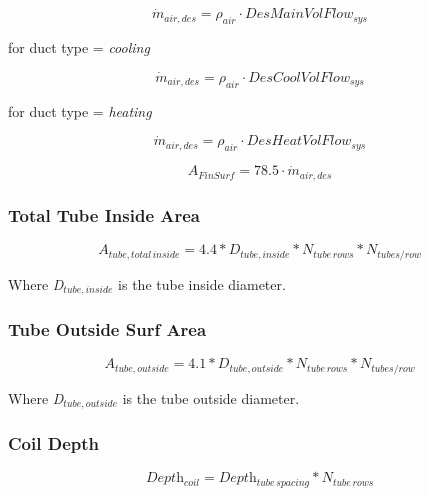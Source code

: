 \begin{equation}
\dot m_{air,des} = \rho_{air} \cdot DesMainVolFlow_{sys}
\end{equation}

for duct type = \emph{cooling}

\begin{equation}
\dot m_{air,des} = \rho_{air} \cdot DesCoolVolFlow_{sys}
\end{equation}

for duct type = \emph{heating}

\begin{equation}
\dot m_{air,des} = \rho_{air} \cdot DesHeatVolFlow_{sys}
\end{equation}

\begin{equation}
A_{FinSurf} = 78.5 \cdot \dot m_{air,des}
\end{equation}

\subsubsection{Total Tube Inside Area}\label{total-tube-inside-area}

\begin{equation}
\textit{A\(_{tube,total\, inside}\)} = 4.4 *\textit{D\(_{tube,inside}\)} *\textit{N\(_{tube\, rows}\)} *\textit{N\(_{tubes/row}\)}
\end{equation}

Where \emph{D\(_{tube,inside}\)} is the tube inside diameter.

\subsubsection{Tube Outside Surf Area}\label{tube-outside-surf-area}

\begin{equation}
\textit{A\(_{tube,outside}\)} = 4.1 *\textit{D\(_{tube,outside}\)} *\textit{N\(_{tube\, rows}\)} *\textit{N\(_{tubes/row}\)}
\end{equation}

Where \emph{D\(_{tube,outside}\)} is the tube outside diameter.

\subsubsection{Coil Depth}\label{coil-depth}

\begin{equation}
\textit{Depth\(_{coil}\)} = \textit{Depth\(_{tube\, spacing}\)} * \textit{N\(_{tube\, rows}\)}
\end{equation}


